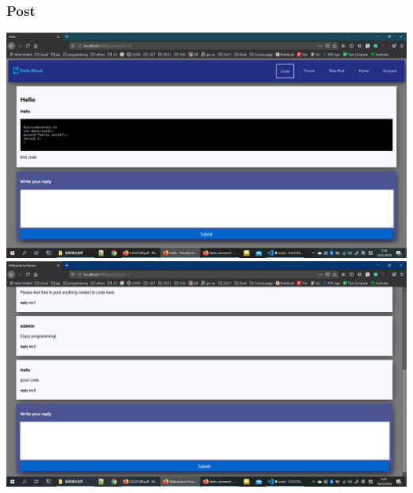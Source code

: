 \subsubsection{Post}
\includegraphics[scale=0.45]{Doc/Pics/post.png}
\includegraphics[scale=0.45]{Doc/Pics/post_comment.png}

